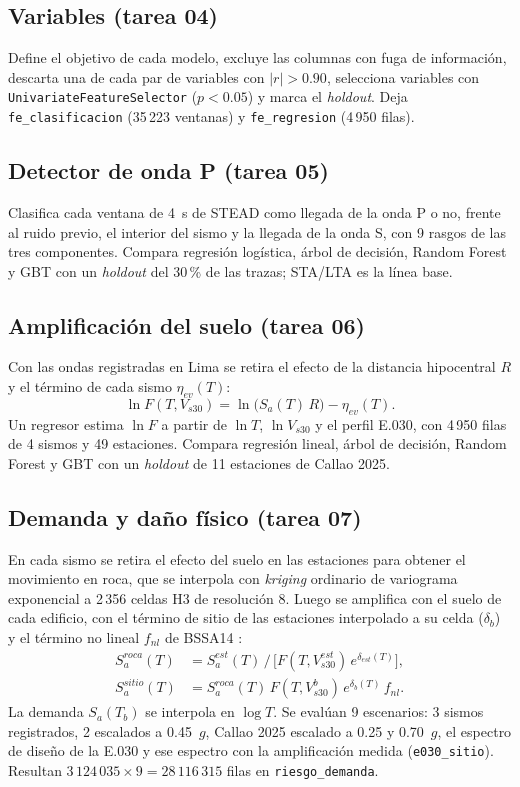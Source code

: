 \documentclass[conference]{IEEEtran}%
\newcommand{\vs}{V_{s30}}
\begin{document}
\subsection{Variables (tarea 04)}
Define el objetivo de cada modelo, excluye las columnas con fuga de información, descarta una de cada par de variables con $|r|>0.90$, selecciona variables con \texttt{UnivariateFeatureSelector} ($p<0.05$) y marca el \emph{holdout}. Deja \texttt{fe\_clasificacion} (35\,223 ventanas) y \texttt{fe\_regresion} (4\,950 filas).

\subsection{Detector de onda P (tarea 05)}
Clasifica cada ventana de 4~s de STEAD \cite{mousavi2019stead} como llegada de la onda P o no, frente al ruido previo, el interior del sismo y la llegada de la onda S, con 9 rasgos de las tres componentes. Compara regresión logística, árbol de decisión, Random Forest y GBT con un \emph{holdout} del 30\,\% de las trazas; STA/LTA es la línea base.

\subsection{Amplificación del suelo (tarea 06)}
Con las ondas registradas en Lima se retira el efecto de la distancia hipocentral $R$ y el término de cada sismo $\eta_{ev}(T)$:
\begin{equation}
\ln F(T,\vs)=\ln\!\big(S_a(T)\,R\big)-\eta_{ev}(T).
\label{eq:amplificacion}
\end{equation}
Un regresor estima $\ln F$ a partir de $\ln T$, $\ln\vs$ y el perfil E.030, con 4\,950 filas de 4 sismos y 49 estaciones. Compara regresión lineal, árbol de decisión, Random Forest y GBT \cite{friedman2001} con un \emph{holdout} de 11 estaciones de Callao 2025.

\subsection{Demanda y daño físico (tarea 07)}
En cada sismo se retira el efecto del suelo en las estaciones para obtener el movimiento en roca, que se interpola con \emph{kriging} ordinario de variograma exponencial a 2\,356 celdas H3 de resolución 8. Luego se amplifica con el suelo de cada edificio, con el término de sitio de las estaciones interpolado a su celda ($\delta_b$) y el término no lineal $f_{nl}$ de BSSA14 \cite{boore2014}:
\begin{equation}
\begin{aligned}
S_a^{roca}(T)&=S_a^{est}(T)\,/\,\big[F(T,V_{s30}^{est})\,e^{\delta_{est}(T)}\big],\\
S_a^{sitio}(T)&=S_a^{roca}(T)\,F(T,V_{s30}^{b})\,e^{\delta_b(T)}\,f_{nl}.
\end{aligned}
\label{eq:demanda}
\end{equation}
La demanda $S_a(T_b)$ se interpola en $\log T$. Se evalúan 9 escenarios: 3 sismos registrados, 2 escalados a 0.45~$g$, Callao 2025 escalado a 0.25 y 0.70~$g$, el espectro de diseño de la E.030 y ese espectro con la amplificación medida (\texttt{e030\_sitio}). Resultan $3\,124\,035\times9=28\,116\,315$ filas en \texttt{riesgo\_demanda}.
\end{document}
